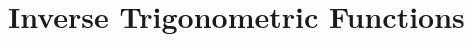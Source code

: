 \documentclass{article}
\begin{document}





\section{Inverse Trigonometric Functions}

%
%
%
%
%
%
\end{document}
